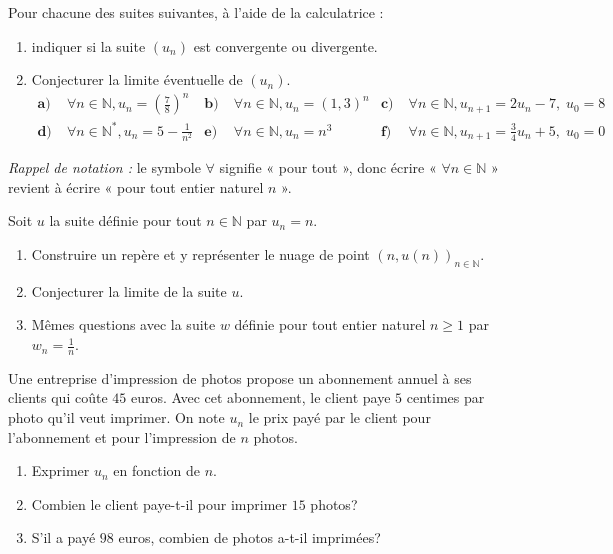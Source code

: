 \documentclass[11pt]{article}
\begin{document}
\begin{exo}
  Pour chacune des suites suivantes, à l'aide de la calculatrice :

\begin{enumerate}
  \item indiquer si la suite $\left(u_{n}\right)$ est convergente ou divergente.

  \item Conjecturer la limite éventuelle de $\left(u_{n}\right)$.
    \begin{align*}
      \textbf{a)}\; & \forall n \in \mathbb{N},
      u_{n}=\left(\frac{7}{8}\right)^{n} &
      \textbf{b)}\; & \forall n \in \mathbb{N}, u_{n}=(1,3)^{n} &
      \textbf{c)}\; & \forall n \in \mathbb{N}, u_{n+1}=2 u_{n}-7,\;u_0=8 \\
      \textbf{d)}\; & \forall n \in \mathbb{N}^*, u_{n}=5-\frac{1}{n^2} &
      \textbf{e)}\; & \forall n \in \mathbb{N}, u_{n}=n^3 &
      \textbf{f)}\; & \forall n \in \mathbb{N}, u_{n+1}=\frac{3}{4}
      u_{n}+5,\;u_0=0
    \end{align*}
\end{enumerate}
\emph{Rappel de notation :} le symbole $\forall$ signifie « pour tout », donc
écrire « $\forall n \in \mathbb{N}$ » revient à écrire « pour tout entier
naturel $n$ ».
\end{exo}

\begin{exo}
  Soit $u$ la suite définie pour tout $n \in \mathbb{N}$ par $u_{n}=n$.
\begin{enumerate}
  \item Construire un repère et y représenter le nuage de point $(n, u(n))_{n
      \in \mathbb{N}}$.
  \item Conjecturer la limite de la suite $u$.
  \item Mêmes questions avec la suite $w$ définie pour tout entier naturel $n
    \geq 1$ par $w_{n}=\frac{1}{n}$.
\end{enumerate}
\end{exo}

\begin{exo}
  Une entreprise d'impression de photos propose un abonnement annuel à ses
  clients qui coûte $45$ euros. Avec cet abonnement, le client paye $5$ centimes
  par photo qu'il veut imprimer. On note $u_{n}$ le prix payé par le client pour
  l'abonnement et pour l'impression de $n$ photos.
\begin{enumerate}
  \item Exprimer $u_{n}$ en fonction de $n$.
  \item Combien le client paye-t-il pour imprimer $15$ photos?
  \item S'il a payé $98$ euros, combien de photos a-t-il imprimées?
\end{enumerate}
\end{exo}
\end{document}
